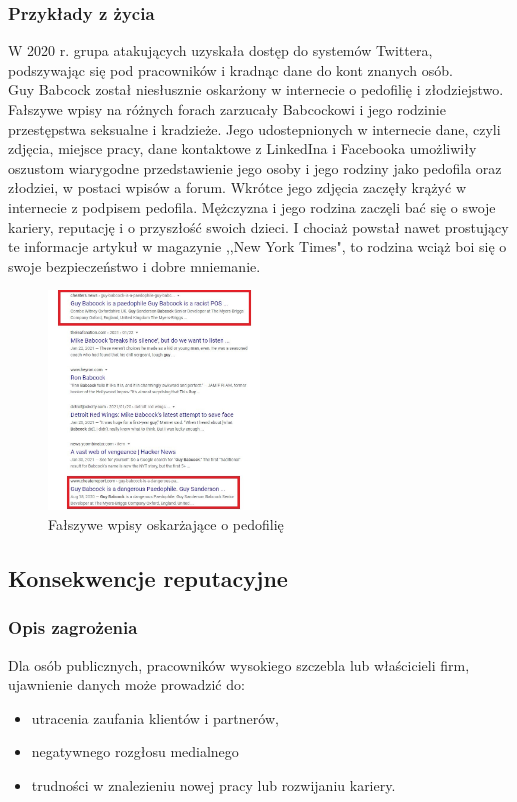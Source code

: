 \subsubsection{Przykłady z życia}
W 2020 r. grupa atakujących uzyskała dostęp do systemów Twittera, podszywając się pod pracowników i kradnąc dane do kont znanych osób.\\

Guy Babcock został niesłusznie oskarżony w internecie o pedofilię i złodziejstwo. Fałszywe wpisy na różnych forach zarzucały Babcockowi i jego rodzinie przestępstwa seksualne i kradzieże. Jego udostepnionych w internecie dane, czyli zdjęcia, miejsce pracy, dane kontaktowe z LinkedIna i Facebooka umożliwiły oszustom wiarygodne przedstawienie jego osoby i jego rodziny jako pedofila oraz złodziei, w postaci wpisów a forum. Wkrótce jego zdjęcia zaczęły krążyć w internecie z podpisem pedofila. Mężczyzna i jego rodzina zaczęli bać się o swoje kariery, reputację i o przyszłość swoich dzieci. I chociaż powstał nawet prostujący te informacje artykuł w magazynie ,,New York Times", to rodzina wciąż boi się o swoje bezpieczeństwo i dobre mniemanie.

\begin{figure}[H]
  \centering
  \includegraphics[width=0.5\textwidth]{images/pedophile.jpg}
  \caption{Fałszywe wpisy oskarżające o pedofilię}
  \label{fig:pedophile}
\end{figure} 

\subsection{Konsekwencje reputacyjne}
\subsubsection{Opis zagrożenia}
Dla osób publicznych, pracowników wysokiego szczebla lub właścicieli firm, ujawnienie danych może prowadzić do:
\begin{itemize}
\item utracenia zaufania klientów i partnerów,
\item negatywnego rozgłosu medialnego
\item trudności w znalezieniu nowej pracy lub rozwijaniu kariery.
\end{itemize}

